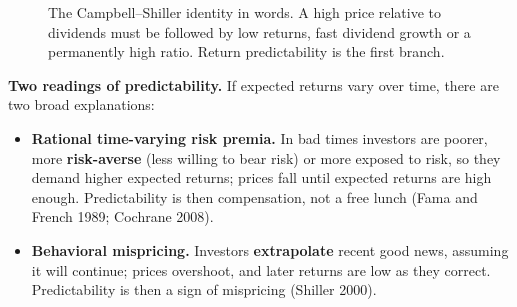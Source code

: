 \begin{figure}[!htbp]
  \centering
  \caption{The Campbell--Shiller identity in words. A high price relative to
    dividends must be followed by low returns, fast dividend growth or a
    permanently high ratio. Return predictability is the first branch.}
  \label{fig:07-identity}
\end{figure}


\textbf{Two readings of predictability.} If expected returns vary over time, there are two broad explanations:

\begin{itemize}
  \item \textbf{Rational time-varying risk premia.} In bad times investors are poorer, more \textbf{risk-averse} (less willing to bear risk) or more exposed to risk, so they demand higher expected returns; prices fall until expected returns are high enough. Predictability is then compensation, not a free lunch (Fama and French 1989; Cochrane 2008).
  \item \textbf{Behavioral mispricing.} Investors \textbf{extrapolate} recent good news, assuming it will continue; prices overshoot, and later returns are low as they correct. Predictability is then a sign of mispricing (Shiller 2000).
\end{itemize}

